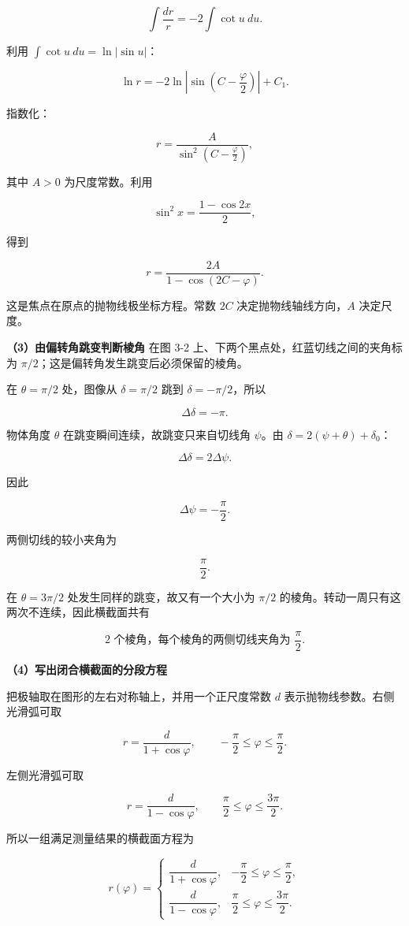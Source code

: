 \documentclass[12pt,a4paper,UTF8]{ctexart}
\begin{document}
\[\int\frac{dr}{r}=-2\int\cot u\ du.\]

利用 \(\int\cot u\ du=\ln|\sin u|\)：

\[\ln r=-2\ln\left|\sin\left(C-\frac\varphi2\right)\right|+C_1.\]

指数化：

\[r=\frac{A}{\sin^2\left(C-\frac\varphi2\right)},\]

其中 \(A>0\) 为尺度常数。利用

\[\sin^2x=\frac{1-\cos2x}{2},\]

得到

\[r=\frac{2A}{1-\cos(2C-\varphi)}.\]

这是焦点在原点的抛物线极坐标方程。常数 \(2C\) 决定抛物线轴线方向，\(A\)
决定尺度。

\textbf{（3）由偏转角跳变判断棱角} 在图 3-2
上、下两个黑点处，红蓝切线之间的夹角标为
\(\pi/2\)；这是偏转角发生跳变后必须保留的棱角。

在 \(\theta=\pi/2\) 处，图像从 \(\delta=\pi/2\) 跳到
\(\delta=-\pi/2\)，所以

\[\Delta\delta=-\pi.\]

物体角度 \(\theta\) 在跳变瞬间连续，故跳变只来自切线角 \(\psi\)。由
\(\delta=2(\psi+\theta)+\delta_0\)：

\[\Delta\delta=2\Delta\psi.\]

因此

\[\Delta\psi=-\frac\pi2.\]

两侧切线的较小夹角为

\[\boxed{\frac\pi2}.\]

在 \(\theta=3\pi/2\) 处发生同样的跳变，故又有一个大小为 \(\pi/2\)
的棱角。转动一周只有这两次不连续，因此横截面共有

\[\boxed{2\text{ 个棱角，每个棱角的两侧切线夹角为 }\frac\pi2}.\]

\textbf{（4）写出闭合横截面的分段方程}

把极轴取在图形的左右对称轴上，并用一个正尺度常数 \(d\)
表示抛物线参数。右侧光滑弧可取

\[r=\frac{d}{1+\cos\varphi},
\qquad -\frac\pi2\le\varphi\le\frac\pi2.\]

左侧光滑弧可取

\[r=\frac{d}{1-\cos\varphi},
\qquad \frac\pi2\le\varphi\le\frac{3\pi}2.\]

所以一组满足测量结果的横截面方程为

\[\boxed{
r(\varphi)=
\begin{cases}
\dfrac{d}{1+\cos\varphi},
&-\dfrac\pi2\le\varphi\le\dfrac\pi2,\\[8pt]
\dfrac{d}{1-\cos\varphi},
&\dfrac\pi2\le\varphi\le\dfrac{3\pi}2.
\end{cases}}
\]
\end{document}
